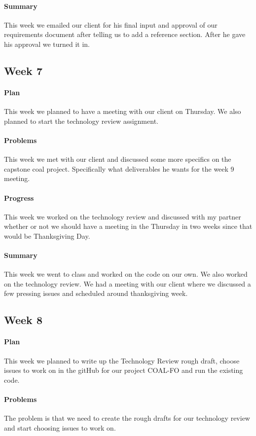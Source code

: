 \documentclass[onecolumn, draftclsnofoot,10pt, compsoc]{IEEEtran}
\begin{document}
\paragraph{Summary}
This week we emailed our client for his final input and approval of our requirements document after telling us to add a reference section. After he gave his approval we turned it in.

\subsection{Week 7}
\paragraph{Plan}
This week we planned to have a meeting with our client on Thursday.  We also planned to start the technology review assignment.
\paragraph{Problems}
This week we met with our client and discussed some more specifics on the capstone coal project. Specifically what deliverables he wants for the week 9 meeting.
\paragraph{Progress}
This week we worked on the technology review and discussed with my partner whether or not we should have a meeting in the Thursday in two weeks since that would be Thanksgiving Day.
\paragraph{Summary}
This week we went to class and worked on the code on our own. We also worked on the technology review. We had a meeting with our client where we discussed a few pressing issues and scheduled around thanksgiving week.

\subsection{Week 8}
\paragraph{Plan}
This week we planned to write up the Technology Review rough draft, choose issues to work on in the gitHub for our project COAL-FO and run the existing code.
\paragraph{Problems}
The problem is that we need to create the rough drafts for our technology review and start choosing issues to work on.
\end{document}
